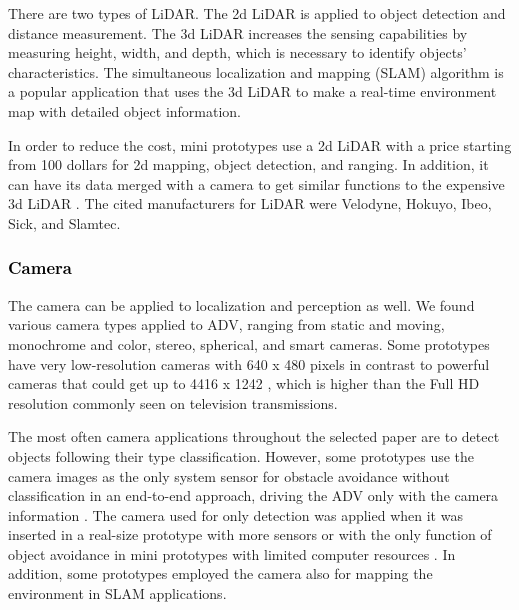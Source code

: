 \documentclass[lettersize,journal]{IEEEtran}
\begin{document}
There are two types of LiDAR. The 2d LiDAR is applied to object detection and distance measurement. The 3d LiDAR increases the sensing capabilities by measuring height, width, and depth, which is necessary to identify objects' characteristics. The simultaneous localization and mapping (SLAM) algorithm is a popular application that uses the 3d LiDAR to make a real-time environment map with detailed object information.

In order to reduce the cost, mini prototypes use a 2d LiDAR with a price starting from 100 dollars for 2d mapping, object detection, and ranging. In addition, it can have its data merged with a camera to get similar functions to the expensive 3d LiDAR \cite{fayjie2018}. The cited manufacturers for LiDAR were Velodyne, Hokuyo, Ibeo, Sick, and Slamtec.


\vspace{\baselineskip}

\subsubsection {\textcolor{black}{\textbf{Camera}}}

\leavevmode\vspace{0.1\baselineskip}%

The camera can be applied to localization and perception as well. We found various camera types applied to ADV, ranging from static and moving, monochrome and color, stereo, spherical, and smart cameras. Some prototypes have very low-resolution cameras with 640 x 480 pixels \cite{Bechtel2019} in contrast to powerful cameras that could get up to 4416 x 1242 \cite{Karaman2017}, which is higher than the Full HD resolution commonly seen on television transmissions.

The most often camera applications throughout the selected paper are to detect objects following their type classification. However, some prototypes use the camera images as the only system sensor for obstacle avoidance without classification in an end-to-end approach,
 driving the ADV only with the camera information \cite{Bechtel2019,fayjie2018,jain2018,do2018,kwon2018,Valocky2019,Bojarski2016}. The camera used for only detection was applied when it was inserted in a real-size prototype with more sensors \cite{Bojarski2016,Belbachir2017,Munir2018,Betz2019,Marin-Plaza2019,el2020,al2018} or with the only function of object avoidance in mini prototypes with limited computer resources \cite{pannu2015}
\cite{Percinski2018}. In addition, some prototypes employed the camera also for mapping the environment in SLAM applications\cite{Tang2018,Martin2016,Zhou2019,Wang2019}.
\end{document}

